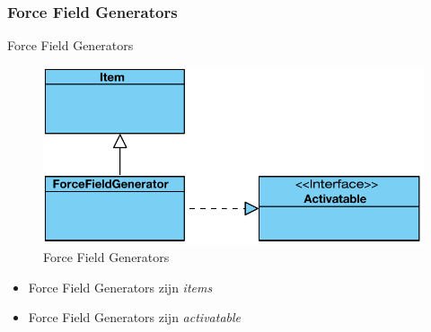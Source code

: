 \documentclass[t]{beamer}
\begin{document}
\subsubsection{Force Field Generators}
\begin{frame}{Force Field Generators}
\begin{figure}
	\center
	\includegraphics[width= 0.5\linewidth]{img/forcefieldgenerator.pdf}
	\caption{Force Field Generators}
\end{figure}
\begin{itemize}
	\item Force Field Generators zijn \textit{items}
	\item Force Field Generators zijn \textit{activatable}
\end{itemize}
\end{frame}
\end{document}
